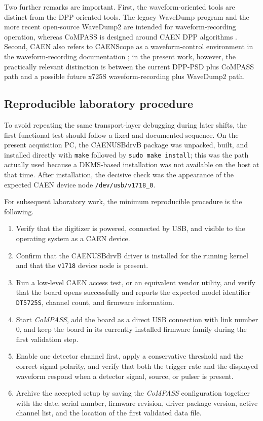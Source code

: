 Two further remarks are important. First, the waveform-oriented tools are distinct from the DPP-oriented tools. The legacy WaveDump program and the more recent open-source WaveDump2 are intended for waveform-recording operation, whereas CoMPASS is designed around CAEN DPP algorithms \citep{CAENWaveDumpPage,CAENWaveDump2Page,CAENCoMPASSPage}. Second, CAEN also refers to CAENScope as a waveform-control environment in the waveform-recording documentation \citep{CAENDWavePage}; in the present work, however, the practically relevant distinction is between the current DPP-PSD plus CoMPASS path and a possible future x725S waveform-recording plus WaveDump2 path.

\subsection{Reproducible laboratory procedure}

To avoid repeating the same transport-layer debugging during later shifts, the first functional test should follow a fixed and documented sequence. On the present acquisition PC, the CAENUSBdrvB package was unpacked, built, and installed directly with \texttt{make} followed by \texttt{sudo make install}; this was the path actually used because a DKMS-based installation was not available on the host at that time. After installation, the decisive check was the appearance of the expected CAEN device node \texttt{/dev/usb/v1718\_0}.

For subsequent laboratory work, the minimum reproducible procedure is the following.

\begin{enumerate}
\item Verify that the digitizer is powered, connected by USB, and visible to the operating system as a CAEN device.
\item Confirm that the CAENUSBdrvB driver is installed for the running kernel and that the \texttt{v1718} device node is present.
\item Run a low-level CAEN access test, or an equivalent vendor utility, and verify that the board opens successfully and reports the expected model identifier \texttt{DT5725S}, channel count, and firmware information.
\item Start \textit{CoMPASS}, add the board as a direct USB connection with link number 0, and keep the board in its currently installed firmware family during the first validation step.
\item Enable one detector channel first, apply a conservative threshold and the correct signal polarity, and verify that both the trigger rate and the displayed waveform respond when a detector signal, source, or pulser is present.
\item Archive the accepted setup by saving the \textit{CoMPASS} configuration together with the date, serial number, firmware revision, driver package version, active channel list, and the location of the first validated data file.
\end{enumerate}

